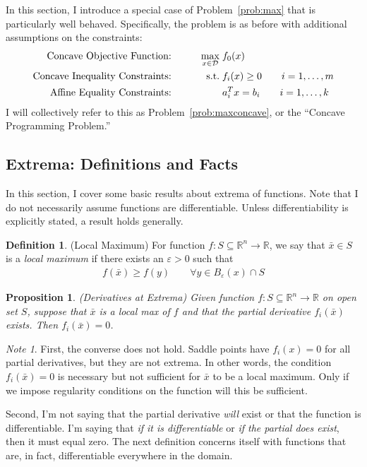 \documentclass[12pt]{article}
\numberwithin{equation}{section} %
\theoremstyle{plain}
\newtheorem{prop}[thm]{Proposition}
\theoremstyle{definition}
\newtheorem{defn}[thm]{Definition}
\theoremstyle{remark}
\newtheorem*{note}{Note}
\newcommand{\R}{\mathbb{R}}
\newcommand{\Rn}{\mathbb{R}^n}
\begin{document}
In this section, I introduce a special case of Problem~\ref{prob:max}
that is particularly well behaved. Specifically, the problem is as
before with additional assumptions on the constraints:
\begin{alignat}{3}
  \text{Concave Objective Function:} \qquad
    && \max_{x\in\mathcal{D}} \; &f_0(x) \label{prob:maxconcave}\\
  \text{Concave Inequality Constraints:} \qquad
    && \text{s.t.} \; &f_i(x) \geq 0 \qquad i = 1,\ldots, m\notag \\
  \text{Affine Equality Constraints:} \qquad
    && &a_i^T x = b_i \qquad i = 1,\ldots,k\notag
\end{alignat}
I will collectively refer to this as Problem~\ref{prob:maxconcave}, or
the ``Concave Programming Problem.''

\subsection{Extrema: Definitions and Facts}
\label{sec:extrema}

In this section, I cover some basic results about extrema of functions.
Note that I do not necessarily assume functions are differentiable.
Unless differentiability is explicitly stated, a result holds generally.

\begin{defn}{(Local Maximum)}
For function $f:S\subseteq\Rn\rightarrow \R$, we say that $\bar{x} \in
S$ is a \emph{local maximum} if there exists an $\varepsilon>0$ such
that
\begin{align*}
  f(\bar{x})\geq f(y)
  \qquad \forall y \in B_\varepsilon(x) \cap S
\end{align*}
\end{defn}

\begin{prop}{\emph{(Derivatives at Extrema)}}
Given function $f:S\subseteq \Rn\rightarrow \R$ on open set $S$, suppose
that $\bar{x}$ is a local max of $f$ and that the partial derivative
$f_i(\bar{x})$ exists.  Then $f_{i}(\bar{x})=0$.
\end{prop}

\begin{note}
First, the converse does not hold. Saddle points have $f_i(x)=0$ for all
partial derivatives, but they are not extrema. In other words, the
condition $f_i(\bar{x})=0$ is necessary but not sufficient for $\bar{x}$
to be a local maximum. Only if we impose regularity conditions on the
function will this be sufficient.

Second, I'm not saying that the partial derivative \emph{will} exist or
that the function is differentiable. I'm saying that \emph{if it is
differentiable} or \emph{if the partial does exist}, then it must equal
zero.
The next definition concerns itself with functions that are, in
fact, differentiable everywhere in the domain.
\end{note}
\end{document}
